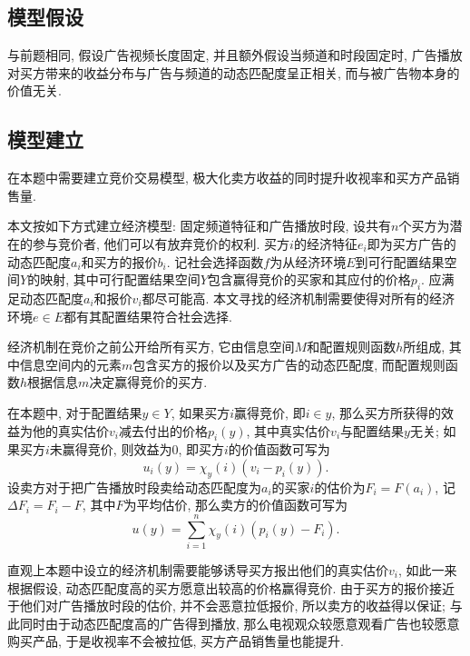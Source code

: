 \subsection{模型假设}

与前题相同, 假设广告视频长度固定, 并且额外假设当频道和时段固定时,
广告播放对买方带来的收益分布与广告与频道的动态匹配度呈正相关,
而与被广告物本身的价值无关.

\subsection{模型建立}

在本题中需要建立竞价交易模型,
极大化卖方收益的同时提升收视率和买方产品销售量.

本文按如下方式建立经济模型: 固定频道特征和广告播放时段,
设共有$n$个买方为潜在的参与竞价者,
他们可以有放弃竞价的权利.
买方$i$的经济特征$e_{i}$即为买方广告的动态匹配度$a_{i}$和买方的报价$b_{i}$.
记社会选择函数$f$为从经济环境$E$到可行配置结果空间$Y$的映射,
其中可行配置结果空间$Y$包含赢得竞价的买家和其应付的价格$p_{i}$.
应满足动态匹配度$a_{i}$和报价$v_{i}$都尽可能高.
本文寻找的经济机制需要使得对所有的经济环境$e\in E$都有其配置结果符合社会选择.

经济机制在竞价之前公开给所有买方, 它由信息空间$M$和配置规则函数$h$所组成,
其中信息空间内的元素$m$包含买方的报价以及买方广告的动态匹配度,
而配置规则函数$h$根据信息$m$决定赢得竞价的买方.

在本题中, 对于配置结果$y\in Y$, 如果买方$i$赢得竞价, 即$i\in y$,
那么买方所获得的效益为他的真实估价$v_{i}$减去付出的价格$p_{i}(y)$,
其中真实估价$v_{i}$与配置结果$y$无关;
如果买方$i$未赢得竞价, 则效益为0, 即买方$i$的价值函数可写为
\begin{equation}
    u_{i}(y) = \chi_{y}(i)(v_{i}-p_{i}(y)).
\end{equation}
设卖方对于把广告播放时段卖给动态匹配度为$a_{i}$的买家$i$的估价为$F_{i}=F(a_{i})$,
记$\Delta F_{i}=F_{i} - F$, 其中$F$为平均估价,
那么卖方的价值函数可写为
\begin{equation}
    u(y) = \sum_{i=1}^{n}{\chi_{y}(i)(p_{i}(y)-F_{i})}.
\end{equation}

直观上本题中设立的经济机制需要能够诱导买方报出他们的真实估价$v_{i}$,
如此一来根据假设, 动态匹配度高的买方愿意出较高的价格赢得竞价.
由于买方的报价接近于他们对广告播放时段的估价, 并不会恶意拉低报价,
所以卖方的收益得以保证; 与此同时由于动态匹配度高的广告得到播放,
那么电视观众较愿意观看广告也较愿意购买产品, 于是收视率不会被拉低,
买方产品销售量也能提升.

